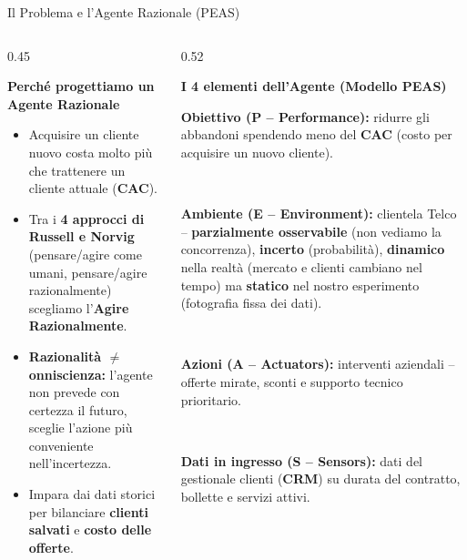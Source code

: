 \documentclass[aspectratio=169, 10pt]{beamer}
\newcommand{\card}[3]{%
    \colorbox{#1}{\parbox{\dimexpr#2-2\fboxsep\relax}{\raggedright #3}}%
}
\begin{document}
\begin{frame}{Il Problema e l'Agente Razionale (PEAS)}
    \begin{columns}[T, onlytextwidth]
        \begin{column}{0.45\textwidth}
            \raggedright
            \textbf{\color{PrimaryNavy} Perché progettiamo un Agente Razionale}
            \vspace{1.8mm}

            \begin{itemize}
                \setlength{\itemsep}{4.5pt}
                \footnotesize
                \item Acquisire un cliente nuovo costa molto più che trattenere un cliente attuale (\textbf{CAC}).
                \item Tra i \textbf{4 approcci di Russell e Norvig} (pensare/agire come umani, pensare/agire razionalmente) scegliamo l'\textbf{Agire Razionalmente}.
                \item \textbf{Razionalità $\neq$ onniscienza:} l'agente non prevede con certezza il futuro, sceglie l'azione più conveniente nell'incertezza.
                \item Impara dai dati storici per bilanciare \textbf{clienti salvati} e \textbf{costo delle offerte}.
            \end{itemize}
        \end{column}

        \begin{column}{0.52\textwidth}
            \raggedright
            \textbf{\color{PrimaryNavy} I 4 elementi dell'Agente (Modello PEAS)}
            \vspace{1.8mm}

            \card{CardBlue}{\linewidth}{\footnotesize
                \textbf{\color{PrimaryNavy} Obiettivo (P -- Performance):} ridurre gli abbandoni spendendo meno del \textbf{CAC} (costo per acquisire un nuovo cliente).
            }\\[2mm]
            \card{CardAmber}{\linewidth}{\footnotesize
                \textbf{\color{AccentAmber} Ambiente (E -- Environment):} clientela Telco -- \textbf{parzialmente osservabile} (non vediamo la concorrenza), \textbf{incerto} (probabilità), \textbf{dinamico} nella realtà (mercato e clienti cambiano nel tempo) ma \textbf{statico} nel nostro esperimento (fotografia fissa dei dati).
            }\\[2mm]
            \card{CardGreen}{\linewidth}{\footnotesize
                \textbf{\color{AccentGreen} Azioni (A -- Actuators):} interventi aziendali -- offerte mirate, sconti e supporto tecnico prioritario.
            }\\[2mm]
            \card{CardBlue}{\linewidth}{\footnotesize
                \textbf{\color{PrimaryNavy} Dati in ingresso (S -- Sensors):} dati del gestionale clienti (\textbf{CRM}) su durata del contratto, bollette e servizi attivi.
            }
        \end{column}
    \end{columns}
\end{frame}
\end{document}
